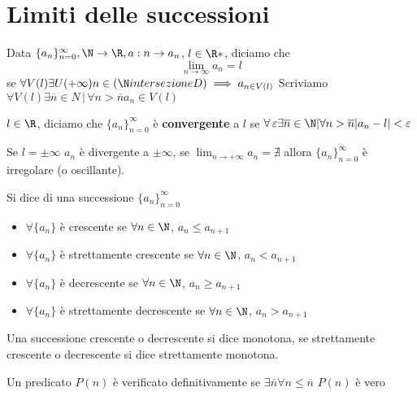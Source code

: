 \section{Limiti delle successioni}

Data $ \{a_{n} \}_{n=0}^\infty, \N \to \R, a: n\to a_{n}  $, $l \in \R*$, diciamo che 
\[
    \lim_{n\to\infty}a_{n}=l  
\]
se $\forall V(l) \exists U(+\infty) n \in(\N intersezione D) \implies a_{n \in V(l)}$
Scriviamo $\forall V(l) \exists \overline{n} \in N \,|\, \forall n>\overline{n} a_{n} \in V(l)$

$l\in \R$, diciamo che $ \{a_{n} \}_{n=0}^\infty $ è \textbf{convergente} a $ l $ se $ \forall\, \varepsilon \exists \overline{n} \in \N | \forall n>\overline{n} |a_{n} -l |<\varepsilon  $

Se $ l=\pm \infty $ $a_{n}$ è divergente a $ \pm\infty $, se $ \lim_{n\to+\infty} a_{n}=\nexists $ allora $ \{a_{n}\}_{n=0 }^\infty$ è irregolare (o oscillante).



Si dice di una successione $\{a_{n} \}_{n=0}^\infty$

\begin{itemize}
    \item $\forall \{a_{n} \}$ è crescente se $ \forall n \in \N $, $ a_{n} \le a_{n+1}  $
    \item $\forall\{a_{n} \}$ è strettamente crescente se $ \forall n \in \N $, $ a_{n} < a_{n+1}  $
    \item $\forall\{a_{n} \}$ è decrescente se $ \forall n \in \N $, $ a_{n} \ge a_{n+1}  $
    \item $\forall \{a_{n} \}$ è strettamente decrescente se $ \forall n \in \N $, $ a_{n} > a_{n+1}  $
\end{itemize}
Una successione crescente o decrescente si dice monotona, se strettamente crescente o decrescente si dice strettamente monotona.

Un predicato $ P(n) $ è verificato definitivamente se $ \exists \overline{n} \forall n\le \overline{n}$ $ P(n) $  è vero

